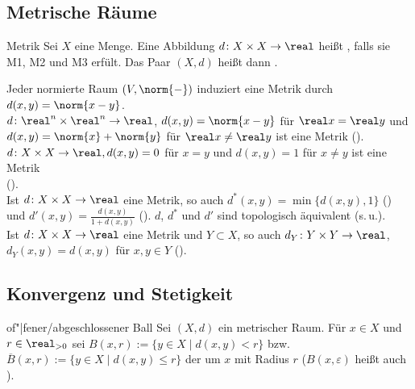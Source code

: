 \subsection{%
    Metrische Räume%
}

\begin{Def}{Metrik}
    Sei $X$ eine Menge.
    Eine Abbildung $d\colon X \times X \rightarrow \real$ heißt
    , falls sie M1, M2 und M3 erfült.
    Das Paar $(X, d)$ heißt dann .
\end{Def}

\begin{Bsp}
    Jeder normierte Raum $(V, \norm{-})$ induziert eine Metrik durch
    $d(x, y) = \norm{x - y}$. \\
    $d\colon \real^n \times \real^n \rightarrow \real$,
    $d(x, y) = \norm{x - y}$ für $\real x = \real y$ und
    $d(x, y) = \norm{x} + \norm{y}$ für $\real x \not= \real y$
    ist eine Metrik (). \\
    $d\colon X \times X \rightarrow \real, d(x, y) = 0$ für $x = y$ und
    $d(x, y) = 1$ für $x \not= y$ ist eine Metrik \\
    (). \\
    Ist $d\colon X \times X \rightarrow \real$ eine Metrik, so auch
    $d^\ast(x, y) = \min\{d(x, y), 1\}$ () und
    $d'(x, y) = \frac{d(x, y)}{1 + d(x, y)}$ ().
    $d$, $d^\ast$ und $d'$ sind topologisch äquivalent (s.\,u.). \\
    Ist $d\colon X \times X \rightarrow \real$ eine Metrik und
    $Y \subset X$, so auch $d_Y\colon Y \times Y \rightarrow \real$,
    $d_Y(x, y)= d(x, y)$ für $x, y \in Y$ ().
\end{Bsp}

\subsection{%
    Konvergenz und Stetigkeit%
}

\begin{Def}{of"|fener/abgeschlossener Ball}
    Sei $(X, d)$ ein metrischer Raum.
    Für $x \in X$ und $r \in \real_{> 0}$ sei
    $B(x, r) := \{y \in X \;|\; d(x, y) < r\}$ bzw.
    $\overline{B}(x, r) := \{y \in X \;|\; d(x, y) \le r\}$
    der  um $x$ mit Radius $r$
    ($B(x, \varepsilon)$ heißt auch ).
\end{Def}

